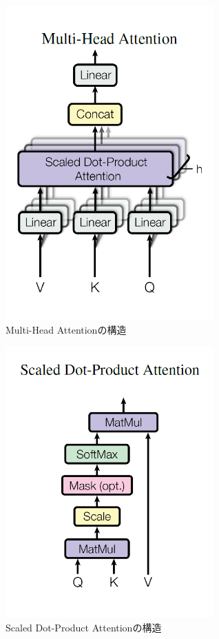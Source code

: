 \begin{figure}[H]
	\centering
	\includegraphics[width=80mm]{image/transformer-multi-head-attention.png}
	\caption{Multi-Head Attentionの構造}
	\label{mha}
\end{figure}

\begin{figure}[H]
	\centering
	\includegraphics[width=80mm]{image/transformer-scaled-dot-product-attention.png}
	\caption{Scaled Dot-Product Attentionの構造}
	\label{sda}
\end{figure}

